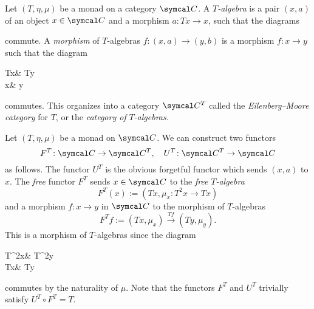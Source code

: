 \begin{definition}
	Let \((T,\eta,\mu)\) be a monad on a category \(\calC\). A \(T\)\emph{-algebra} is a pair \((x,a)\) of an object \(x\in\calC\) and a morphism \(a\!:Tx\to x\), such that the diagrams
	\begin{center}
	\quad
	\end{center}
	commute. A \emph{morphism} of \(T\)-algebras \(f\!:(x,a)\to (y,b)\) is a morphism \(f\!:x\to y\) such that the diagram
	\begin{diagram*}
		Tx\ar[r,"Tf"]\ar[d,"a"'] & Ty\ar[d,"b"] \\
		x\ar[r,"f"] & y
	\end{diagram*}
	commutes. This organizes into a category \(\calC^T\) called the \emph{Eilenberg--Moore category} for \(T\), or the \emph{category of} \(T\)\emph{-algebras.}
\end{definition}
\begin{construction}\label{construction:free-forgetful-algebra-functors}
	Let \((T,\eta,\mu)\) be a monad on \(\calC\). We can construct two functors
	\[ F^T\!:\calC\to\calC^T, \quad U^T\!:\calC^T\to\calC \]
	as follows. The functor \(U^T\) is the obvious forgetful functor which sends \((x,a)\) to \(x\). The \emph{free} functor \(F^T\) sends \(x\in\calC\) to the \emph{free} \(T\)\emph{-algebra}
	\[ F^T(x) := (Tx, \mu_x\!:T^2x\to Tx) \]
	and a morphism \(f\!:x\to y\) in \(\calC\) to the morphism of \(T\)-algebras
	\[ F^Tf := (Tx,\mu_x) \xrightarrow{Tf} (Ty,\mu_y). \]
	This is a morphism of \(T\)-algebras since the diagram
	\begin{diagram*}
		T^2x\ar[r,"T^2f"]\ar[d,"\mu_x"'] & T^2y\ar[d,"\mu_y"] \\
		Tx\ar[r,"Tf"] & Ty
	\end{diagram*}
	commutes by the naturality of \(\mu\). Note that the functors \(F^T\) and \(U^T\) trivially satisfy \(U^T\circ F^T = T\).
\end{construction}

